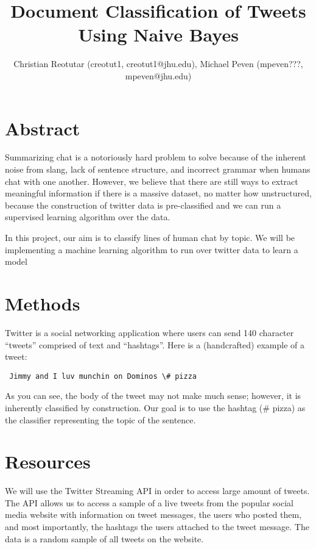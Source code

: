 \documentclass[11pt]{article}
\title{Document Classification of Tweets Using Naive Bayes}
\author{Christian Reotutar (creotut1, creotut1@jhu.edu), Michael Peven (mpeven???, mpeven@jhu.edu)}
\date{}
\begin{document}
\maketitle

\section{Abstract}
Summarizing chat is a notoriously hard problem to solve because of the inherent noise from slang, lack of sentence structure, and incorrect grammar when humans chat with one another. However, we believe that there are still ways to extract meaningful information if there is a massive dataset, no matter how unstructured, because the construction of twitter data is pre-classified and we can run a supervised learning algorithm over the data.

In this project, our aim is to classify lines of human chat by topic. We will be implementing a machine learning algorithm to run over twitter data to learn a model

\section{Methods}
Twitter is a social networking application where users can send 140 character “tweets” comprised of text and “hashtags”. Here is a (handcrafted) example of a tweet:

\begin{verbatim} Jimmy and I luv munchin on Dominos \# pizza \end{verbatim}

As you can see, the body of the tweet may not make much sense; however, it is inherently classified by construction. Our goal is to use the hashtag (\# pizza) as the classifier representing the topic of the sentence. 

\section{Resources}
We will use the Twitter Streaming API in order to access large amount of tweets. The API allows us to access a sample of a live tweets from the popular social media website with information on tweet messages, the users who posted them, and most importantly, the hashtags the users attached to the tweet message. The data is a random sample of all tweets on the website.
\end{document}
